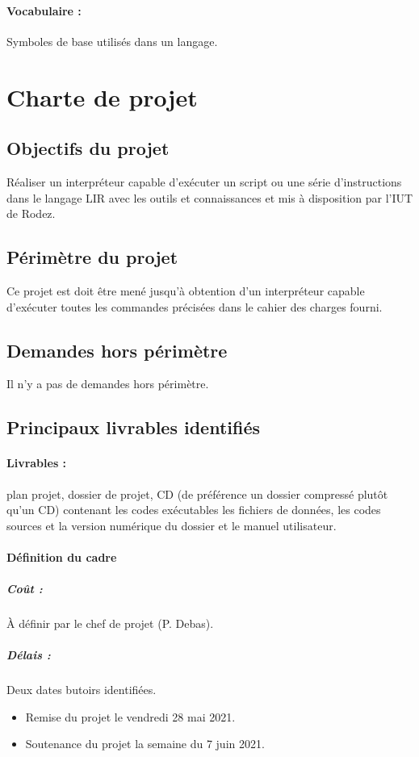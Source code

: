\documentclass[11pt,a4paper,titlepage,openright]{report}
\begin{document}
        \paragraph{Vocabulaire :}
        Symboles de base utilisés dans un langage.

    \section{Charte de projet}
    \subsection{Objectifs du projet}
    Réaliser un interpréteur capable d'exécuter un script ou une série d'instructions dans le langage LIR avec les outils et connaissances et mis à disposition par l’IUT de Rodez.

    \subsection{Périmètre du projet}
    Ce projet est doit être mené jusqu'à obtention d’un interpréteur capable d’exécuter toutes les commandes précisées dans le cahier des charges fourni.

    \subsection{Demandes hors périmètre}
    Il n’y a pas de demandes hors périmètre.

    \subsection{Principaux livrables identifiés}
    \paragraph{Livrables :} plan projet, dossier de projet, CD (de préférence un dossier compressé plutôt qu’un CD) contenant les codes exécutables les fichiers de données, les codes sources et la version numérique du dossier et le manuel utilisateur.

    \paragraph{Définition du cadre}
    \subparagraph{Coût :} À définir par le chef de projet (P. Debas).
    \subparagraph{Délais :} Deux dates butoirs identifiées.
        \begin{itemize}
            \item Remise du projet le vendredi 28 mai 2021.
            \item Soutenance du projet la semaine du 7 juin 2021.
        \end{itemize}
\end{document}
